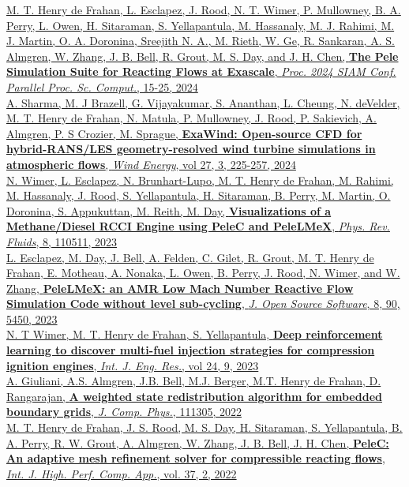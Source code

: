 \documentclass[11pt,letterpaper]{article}
\begin{document}
\href{https://doi.org/10.1137/1.9781611977967.2}{M. T. Henry de Frahan, L. Esclapez, J. Rood, N. T. Wimer, P. Mullowney, B. A. Perry, L. Owen, H. Sitaraman, S. Yellapantula, M. Hassanaly, M. J. Rahimi, M. J. Martin, O. A. Doronina, Sreejith N. A., M. Rieth, W. Ge, R. Sankaran, A. S. Almgren, W. Zhang, J. B. Bell, R. Grout, M. S. Day, and J. H. Chen, \textbf{The Pele Simulation Suite for Reacting Flows at Exascale}, \textit{Proc. 2024 SIAM Conf. Parallel Proc. Sc. Comput.}, 15-25, 2024}\\[2ex]
\href{https://doi.org/10.1002/we.2886}{A. Sharma, M. J Brazell, G. Vijayakumar, S. Ananthan, L. Cheung, N. deVelder, M. T. Henry de Frahan, N. Matula, P. Mullowney, J. Rood, P. Sakievich, A. Almgren, P. S Crozier, M. Sprague, \textbf{ExaWind: Open-source CFD for hybrid-RANS/LES geometry-resolved wind turbine simulations in atmospheric flows}, \textit{Wind Energy}, vol 27, 3, 225-257, 2024}\\[2ex]
\href{https://doi.org/10.1103/PhysRevFluids.8.110511}{N. Wimer, L. Esclapez, N. Brunhart-Lupo, M. T. Henry de Frahan, M. Rahimi, M. Hassanaly, J. Rood, S. Yellapantula, H. Sitaraman, B. Perry, M. Martin, O. Doronina, S. Appukuttan, M. Reith, M. Day, \textbf{Visualizations of a Methane/Diesel RCCI Engine using PeleC and PeleLMeX}, \textit{Phys. Rev. Fluids}, 8, 110511, 2023}\\[2ex]
\href{https://doi.org/10.21105/joss.05450}{L. Esclapez, M. Day, J. Bell, A. Felden, C. Gilet, R. Grout, M. T. Henry de Frahan, E. Motheau, A. Nonaka, L. Owen, B. Perry, J. Rood, N. Wimer, and W. Zhang, \textbf{PeleLMeX: an AMR Low Mach Number Reactive Flow Simulation Code without level sub-cycling}, \textit{J. Open Source Software}, 8, 90, 5450, 2023}\\[2ex]
\href{https://doi.org/10.1177/1468087423118400}{N. T Wimer, M. T. Henry de Frahan, S. Yellapantula, \textbf{Deep reinforcement learning to discover multi-fuel injection strategies for compression ignition engines}, \textit{Int. J. Eng. Res.}, vol 24, 9, 2023}\\[2ex]
\href{https://doi.org/10.1103/PhysRevFluids.6.110504}{A. Giuliani, A.S. Almgren, J.B. Bell, M.J. Berger, M.T. Henry de Frahan, D. Rangarajan, \textbf{A weighted state redistribution algorithm for embedded boundary grids}, \textit{J. Comp. Phys.}, 111305, 2022}\\[2ex]
\href{https://doi.org/10.1177/10943420221121151}{M. T. Henry de Frahan, J. S. Rood, M. S. Day, H. Sitaraman, S. Yellapantula, B. A. Perry, R. W. Grout, A. Almgren, W. Zhang, J. B. Bell, J. H. Chen, \textbf{PeleC: An adaptive mesh refinement solver for compressible reacting flows}, \textit{Int. J. High. Perf. Comp. App.}, vol. 37, 2, 2022}\\[2ex]
\end{document}
